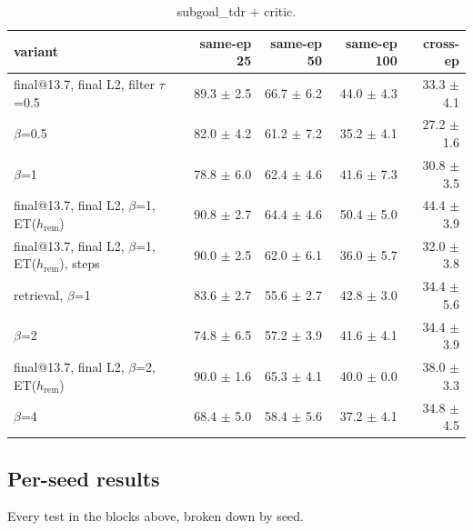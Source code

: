 \begin{table}[H]
\centering\small
\caption{subgoal\_tdr + critic.}
\label{tab:gas-mpc-subgoal_tdr-crit-task200-n50}
\begin{tabular}{lrrrr}
\toprule
variant & same-ep 25 & same-ep 50 & same-ep 100 & cross-ep \\
\midrule
final@13.7, final L2, filter $\tau$=0.5 & 89.3 $\pm$ 2.5 & 66.7 $\pm$ 6.2 & 44.0 $\pm$ 4.3 & 33.3 $\pm$ 4.1 \\
$\beta$=0.5 & 82.0 $\pm$ 4.2 & 61.2 $\pm$ 7.2 & 35.2 $\pm$ 4.1 & 27.2 $\pm$ 1.6 \\
$\beta$=1 & 78.8 $\pm$ 6.0 & 62.4 $\pm$ 4.6 & 41.6 $\pm$ 7.3 & 30.8 $\pm$ 3.5 \\
final@13.7, final L2, $\beta$=1, ET($h_{\mathrm{rem}}$) & 90.8 $\pm$ 2.7 & 64.4 $\pm$ 4.6 & 50.4 $\pm$ 5.0 & 44.4 $\pm$ 3.9 \\
final@13.7, final L2, $\beta$=1, ET($h_{\mathrm{rem}}$), steps & 90.0 $\pm$ 2.5 & 62.0 $\pm$ 6.1 & 36.0 $\pm$ 5.7 & 32.0 $\pm$ 3.8 \\
retrieval, $\beta$=1 & 83.6 $\pm$ 2.7 & 55.6 $\pm$ 2.7 & 42.8 $\pm$ 3.0 & 34.4 $\pm$ 5.6 \\
$\beta$=2 & 74.8 $\pm$ 6.5 & 57.2 $\pm$ 3.9 & 41.6 $\pm$ 4.1 & 34.4 $\pm$ 3.9 \\
final@13.7, final L2, $\beta$=2, ET($h_{\mathrm{rem}}$) & 90.0 $\pm$ 1.6 & 65.3 $\pm$ 4.1 & 40.0 $\pm$ 0.0 & 38.0 $\pm$ 3.3 \\
$\beta$=4 & 68.4 $\pm$ 5.0 & 58.4 $\pm$ 5.6 & 37.2 $\pm$ 4.1 & 34.8 $\pm$ 4.5 \\
\bottomrule
\end{tabular}
\end{table}

\clearpage
\subsection*{Per-seed results}
Every test in the blocks above, broken down by seed.

